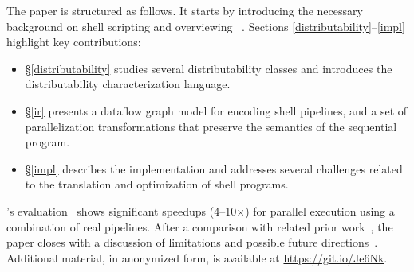 \documentclass[letterpaper,twocolumn,10pt]{article}
\begin{document}

The paper is structured as follows.
It starts by introducing the necessary background on shell scripting and overviewing \sys~.
Sections \ref{distributability}--\ref{impl} highlight key
contributions:
\begin{itemize}

  \item
  \S\ref{distributability} studies several distributability classes and introduces the distributability characterization language.

  \item
  \S\ref{ir} presents a dataflow graph model for encoding shell pipelines, and a set of parallelization transformations that preserve the semantics of the sequential program.

  \item
    \S\ref{impl} describes the \sys implementation and addresses
    several challenges related to the translation and optimization of
    shell programs.
\end{itemize}

\noindent
\sys's evaluation~ shows significant speedups (4--10$\times$) for parallel execution using a combination of real pipelines. %
After a comparison with related prior work~, the paper closes with a discussion of limitations and possible future directions~.
Additional material, in anonymized form, is available at
\href{https://git.io/Je6Nk}{https://git.io/Je6Nk}.

% 
\end{document}
